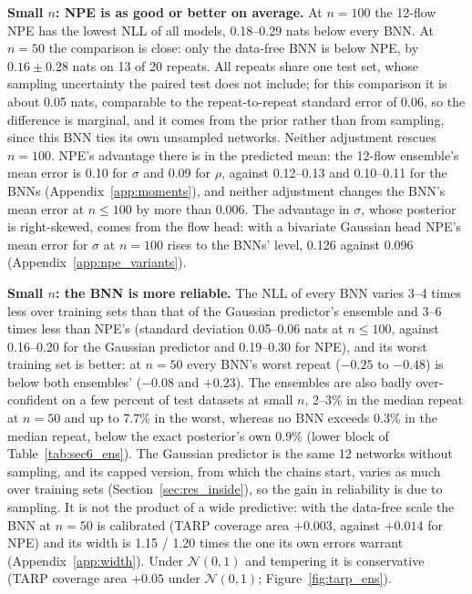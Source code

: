\documentclass[11pt]{article}
\begin{document}
\textbf{Small $n$: NPE is as good or better on average.} At $n=100$ the 12-flow NPE has the lowest NLL of all models,
0.18--0.29 nats below every BNN. At $n=50$ the comparison is close: only the data-free BNN is below NPE, by
$0.16\pm0.28$ nats on 13 of 20 repeats. All repeats share one test set, whose sampling uncertainty the paired test does
not include; for this comparison it is about 0.05 nats, comparable to the repeat-to-repeat standard error of 0.06, so the
difference is marginal, and it comes from the prior rather than from sampling, since this BNN ties its own unsampled
networks. Neither adjustment rescues $n=100$. NPE's advantage there is in the predicted mean: the 12-flow ensemble's
mean error is 0.10 for $\sigma$ and 0.09 for $\rho$, against 0.12--0.13 and 0.10--0.11 for the BNNs
(Appendix~\ref{app:moments}), and neither adjustment changes the BNN's mean error at $n\le100$ by more than 0.006. The
advantage in $\sigma$, whose posterior is right-skewed, comes from the flow head: with a bivariate Gaussian head NPE's
mean error for $\sigma$ at $n=100$ rises to the BNNs' level, 0.126 against 0.096 (Appendix~\ref{app:npe_variants}).

\textbf{Small $n$: the BNN is more reliable.} The NLL of every BNN varies 3--4 times less over training sets than that
of the Gaussian predictor's ensemble and 3--6 times less than NPE's (standard deviation 0.05--0.06 nats at $n\le100$, against 0.16--0.20 for the Gaussian predictor and
0.19--0.30 for NPE), and its worst training set is better: at $n=50$ every BNN's worst repeat ($-0.25$ to $-0.48$) is
below both ensembles' ($-0.08$ and $+0.23$). The ensembles are also badly over-confident on a few percent of test
datasets at small $n$, 2--3\% in the median repeat at $n=50$ and up to 7.7\% in the worst, whereas no BNN exceeds 0.3\%
in the median repeat, below the exact posterior's own 0.9\% (lower block of Table~\ref{tab:sec6_ens}). The
Gaussian predictor is the same 12 networks without sampling, and its capped version, from which the chains start,
varies as much over training sets (Section~\ref{sec:res_inside}), so the gain in reliability is due to sampling. It
is not the product of a wide predictive: with the data-free scale the BNN at $n=50$ is calibrated (TARP coverage area
$+0.003$, against $+0.014$ for NPE) and its width is 1.15 / 1.20 times the one its own errors warrant
(Appendix~\ref{app:width}). Under $\mathcal N(0,1)$ and tempering it is conservative (TARP coverage area $+0.05$ under
$\mathcal N(0,1)$; Figure~\ref{fig:tarp_ens}).
\end{document}
